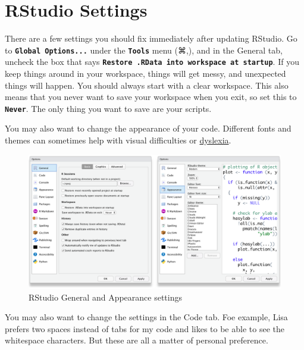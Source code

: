 \documentclass[
  oneside]{book}
\begin{document}
\hypertarget{rstudio-settings}{%
\section{RStudio Settings}\label{rstudio-settings}}

There are a few settings you should fix immediately after updating RStudio. Go to \textbf{\texttt{Global\ Options...}} under the \textbf{\texttt{Tools}} menu (⌘,), and in the General tab, uncheck the box that says \textbf{\texttt{Restore\ .RData\ into\ workspace\ at\ startup}}. If you keep things around in your workspace, things will get messy, and unexpected things will happen. You should always start with a clear workspace. This also means that you never want to save your workspace when you exit, so set this to \textbf{\texttt{Never}}. The only thing you want to save are your scripts.

You may also want to change the appearance of your code. Different fonts and themes can sometimes help with visual difficulties or \href{https://datacarpentry.org/blog/2017/09/coding-and-dyslexia}{dyslexia}.

\begin{figure}

{\centering \includegraphics[width=1\linewidth]{images/rstudio_settings_general_appearance} 

}

\caption{RStudio General and Appearance settings}\label{fig:settings-general}
\end{figure}

You may also want to change the settings in the Code tab. Foe example, Lisa prefers two spaces instead of tabs for my code and likes to be able to see the whitespace{} characters. But these are all a matter of personal preference.
\end{document}

